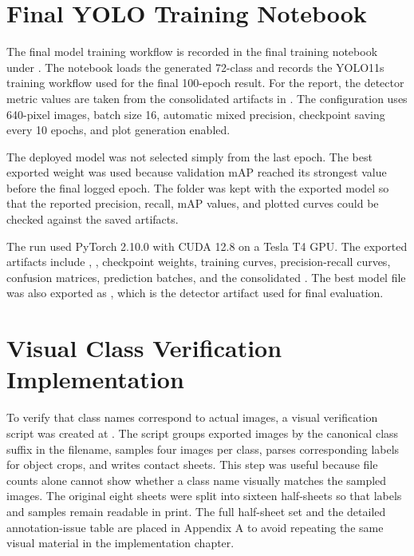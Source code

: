 \section{Final YOLO Training Notebook}

The final model training workflow is recorded in the final training notebook under . The notebook loads the generated 72-class  and records the YOLO11s training workflow used for the final 100-epoch result. For the report, the detector metric values are taken from the consolidated artifacts in . The configuration uses 640-pixel images, batch size 16, automatic mixed precision, checkpoint saving every 10 epochs, and plot generation enabled.

The deployed model was not selected simply from the last epoch. The best exported weight was used because validation mAP reached its strongest value before the final logged epoch. The  folder was kept with the exported model so that the reported precision, recall, mAP values, and plotted curves could be checked against the saved artifacts.

The run used PyTorch 2.10.0 with CUDA 12.8 on a Tesla T4 GPU. The exported artifacts include , , checkpoint weights, training curves, precision-recall curves, confusion matrices, prediction batches, and the consolidated . The best model file was also exported as , which is the detector artifact used for final evaluation.

\section{Visual Class Verification Implementation}

To verify that class names correspond to actual images, a visual verification script was created at . The script groups exported images by the canonical class suffix in the filename, samples four images per class, parses corresponding labels for object crops, and writes contact sheets. This step was useful because file counts alone cannot show whether a class name visually matches the sampled images. The original eight sheets were split into sixteen half-sheets so that labels and samples remain readable in print. The full half-sheet set and the detailed annotation-issue table are placed in Appendix A to avoid repeating the same visual material in the implementation chapter.

